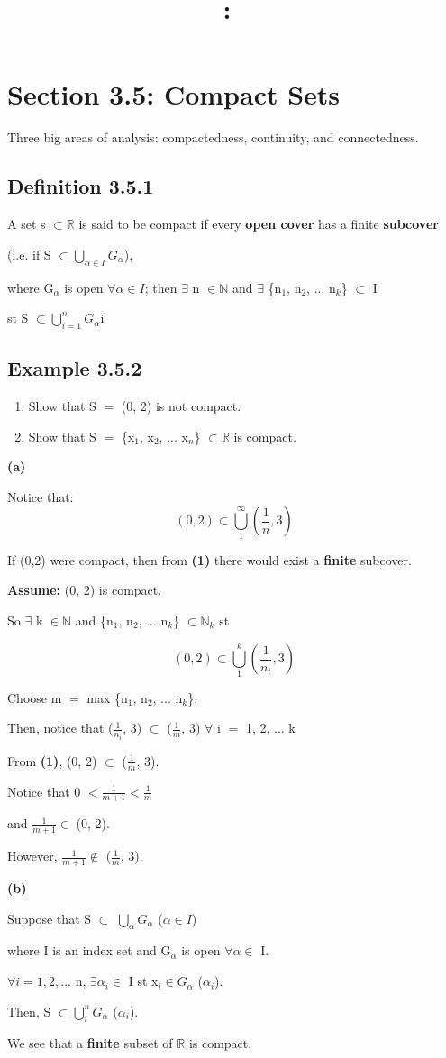 \documentclass{article}
\title{
    \vspace{2in}
    \textmd{\textbf{\hmwkClass:\ \hmwkTitle}}\\
    \normalsize\vspace{0.1in}\small\vspace{0.1in}\large{\textit{\hmwkClassInstructor}}
    \vspace{3in}
}
\author{\hmwkAuthorName}
\date{}
\newcommand\bsc[2][\DefaultOpt]{%
  \def\DefaultOpt{#2}%
  \section[#1]{#2}%
}
\newcommand\ssc[2][\DefaultOpt]{%
  \def\DefaultOpt{#2}%
  \subsection[#1]{#2}%
}
\newcommand{\balist}{\begin{enumerate}[label=\alph*.]}
\newcommand{\elist}{\end{enumerate}}
\newcommand{\as}[1]{\textbf{Assume: } #1}
\newcommand{\bpth}[1]{\textbf{(#1)}}
\newcommand{\step}[2]{\begin{equation}\tag{#2}#1\end{equation}}
\newcommand{\br}{\mathbb{R}}       %
\newcommand{\bn}{\mathbb{N}}       %
\newcommand{\fa}{\forall}          %
\newcommand{\sbs}{\subset}         %
\begin{document}
\bsc{Section 3.5: Compact Sets}{
Three big areas of analysis: compactedness, continuity, and connectedness.

\ssc{Definition 3.5.1}{A set s $\sbs \br$ is said to be compact if every \textbf{open cover} has a finite \textbf{subcover} \

(i.e. if S $\sbs \bigcup_{\alpha \in I} G_\alpha$), \

where G$_\alpha$ is open $\fa \alpha \in I$; then $\exists$ n $\in \bn$ and $\exists$ \{n$_1$, n$_2$, ... n$_k$\} $\sbs$ I \

st S $\sbs \bigcup_{i = 1}^n G_\alpha$i
}

\ssc{Example 3.5.2}{
\balist
\item Show that S $=$ (0, 2) is not compact.
\item Show that S $=$ \{x$_1$, x$_2$, ... x$_n$\} $\sbs \br$ is compact.
\elist

\textbf{(a)} \

Notice that:
\step{(0, 2) \sbs \bigcup^\infty_1 (\frac{1}{n}, 3)}{1}
}

If (0,2) were compact, then from \bpth{1} there would exist a \textbf{finite} subcover.

\as{(0, 2) is compact.} \

So $\exists$ k $\in \bn$ and \{n$_1$, n$_2$, ... n$_k$\} $\sbs \bn_k$ st

\step{(0, 2) \sbs \bigcup^k_1 (\frac{1}{n_i}, 3)}{2}

Choose m $=$ max \{n$_1$, n$_2$, ... n$_k$\}. \

Then, notice that ($\frac{1}{n_i}$, 3) $\sbs$ ($\frac{1}{m}$, 3) $\fa$ i $=$ 1, 2, ... k \

From \bpth{1}, (0, 2) $\sbs$ ($\frac{1}{m}$, 3).

Notice that 0 $< \frac{1}{m + 1} < \frac{1}{m}$ \

and $\frac{1}{m + 1} \in$ (0, 2). \

However, $\frac{1}{m + 1} \not\in$ ($\frac{1}{m}$, 3).

\textbf{(b)} \

Suppose that S $\sbs$ $\bigcup_\alpha G_\alpha$ ($\alpha \in I$)

where I is an index set and G$_\alpha$ is open $\fa \alpha \in$ I.

$\fa i = 1, 2,...$ n, $\exists \alpha_i \in$ I st x$_i \in G_\alpha$ ($\alpha_i$). \

Then, S $\sbs \bigcup^n_i G_\alpha$ ($\alpha_i$).

We see that a \textbf{finite} subset of $\br$ is compact.
}
\end{document}
